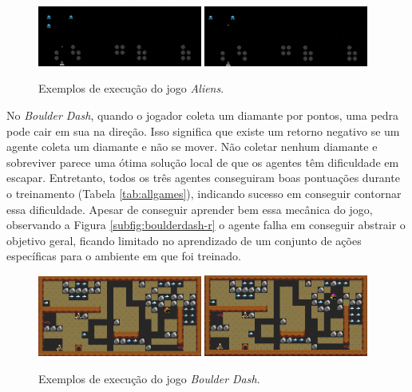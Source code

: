 \begin{figure}[ht]
 \begin{center}
  \subfigure
  {
    \includegraphics[width=0.48\textwidth]{./fig/gvgai-aliens-lvl0-v0-frame94}
    \label{subfig:a-frame1}
  } 
  \subfigure
  {
    \includegraphics[width=0.48\textwidth]{./fig/gvgai-aliens-lvl0-v0-frame95}
    \label{subfig:a-frame2}
  }
  \caption{Exemplos de execução do jogo \textit{Aliens}.}
  \label{fig:aliensframe}
\end{center}
\end{figure}

No \textit{Boulder Dash}, quando o jogador coleta um diamante por pontos, uma pedra pode cair em sua na direção. Isso significa que existe um retorno negativo se um agente coleta um diamante e não se mover. Não coletar nenhum diamante e sobreviver parece uma ótima solução local de que os agentes têm dificuldade em escapar. Entretanto, todos os três agentes conseguiram boas pontuações durante o treinamento (Tabela \ref{tab:allgames}), indicando sucesso em conseguir contornar essa dificuldade. Apesar de conseguir aprender bem essa mecânica do jogo, observando a Figura \ref{subfig:boulderdash-r} o agente falha em conseguir abstrair o objetivo geral, ficando limitado no aprendizado de um conjunto de ações específicas para o ambiente em que foi treinado. 

\begin{figure}[ht]
 \begin{center}
  \subfigure
  {
    \includegraphics[width=0.48\textwidth]{./fig/gvgai-boulderdash-lvl0-v0-frame25}
    \label{subfig:b-frame1}
  } 
  \subfigure
  {
    \includegraphics[width=0.48\textwidth]{./fig/gvgai-boulderdash-lvl0-v0-frame26}
    \label{subfig:b-frame2}
  }
  \caption{Exemplos de execução do jogo \textit{Boulder Dash}.}
  \label{fig:boulderdashframe}
\end{center}
\end{figure}

